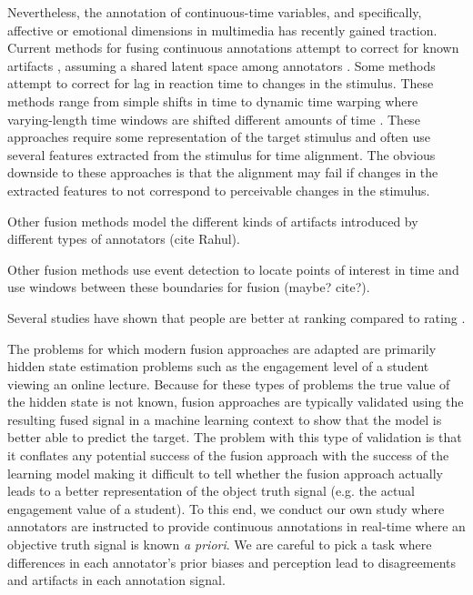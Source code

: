 \documentclass[]{article}
\begin{document}
Nevertheless, the annotation of continuous-time variables, and specifically, affective or emotional dimensions in multimedia has recently gained traction.  Current methods for fusing continuous annotations attempt to correct for known artifacts \cite{Mariooryad2015}, assuming a shared latent space among annotators \cite{Gupta2016, zhu2015fusing}.  Some methods attempt to correct for lag in reaction time to changes in the stimulus.  These methods range from simple shifts in time to dynamic time warping where varying-length time windows are shifted different amounts of time \cite{Include CCA}.  These approaches require some representation of the target stimulus and often use several features extracted from the stimulus for time alignment.  The obvious downside to these approaches is that the alignment may fail if changes in the extracted features to not correspond to perceivable changes in the stimulus.

Other fusion methods model the different kinds of artifacts introduced by different types of annotators (cite Rahul).

Other fusion methods use event detection to locate points of interest in time and use windows between these boundaries for fusion (maybe? cite?).

Several studies have shown that people are better at ranking compared to rating \cite{metallinou2013annotation}.  

The problems for which modern fusion approaches are adapted are primarily hidden state estimation problems such as the engagement level of a student viewing an online lecture.  Because for these types of problems the true value of the hidden state is not known, fusion approaches are typically validated using the resulting fused signal in a machine learning context to show that the model is better able to predict the target.  The problem with this type of validation is that it conflates any potential success of the fusion approach with the success of the learning model making it difficult to tell whether the fusion approach actually leads to a better representation of the object truth signal (e.g. the actual engagement value of a student).  To this end, we conduct our own study where annotators are instructed to provide continuous annotations in real-time where an objective truth signal is known \textit{a priori}.  We are careful to pick a task where differences in each annotator's prior biases and perception lead to disagreements and artifacts in each annotation signal.
\end{document}
